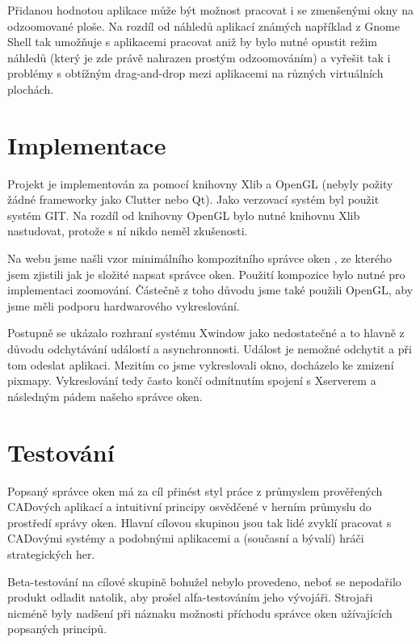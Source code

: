 \documentclass[12pt,a4paper,titlepage,final]{article}
\begin{document}
Přidanou hodnotou aplikace může být možnost pracovat i se zmenšenými okny na odzoomované ploše.
Na rozdíl od náhledů aplikací známých například z Gnome Shell tak umožňuje s aplikacemi pracovat aniž by bylo nutné opustit režim náhledů (který je zde právě nahrazen prostým odzoomováním) a vyřešit tak i problémy s obtížným drag-and-drop mezi aplikacemi na různých virtuálních plochách.

\section{Implementace}

Projekt je implementován za pomocí knihovny Xlib \cite{Xlib} a OpenGL (nebyly požity žádné frameworky jako Clutter nebo Qt).
Jako verzovací systém byl použit systém GIT.
Na rozdíl od knihovny OpenGL bylo nutné knihovnu Xlib nastudovat, protože s ní nikdo neměl zkušenosti.

Na webu jsme našli vzor minimálního kompozitního správce oken \cite{min_comp_wm}, ze kterého jsem zjistili jak je složité napsat správce oken.
Použití kompozice bylo nutné pro implementaci zoomování.
Částečně z toho důvodu jsme také použili OpenGL, aby jsme měli podporu hardwarového vykreslování.

Postupně se ukázalo rozhraní systému Xwindow jako nedostatečné a to hlavně z důvodu odchytávání událostí a asynchronnosti.
Událost je nemožné odchytit a při tom odeslat aplikaci.
Mezitím co jsme vykreslovali okno, docházelo ke zmizení pixmapy.
Vykreslování tedy často končí odmítnutím spojení s Xserverem a následným pádem našeho správce oken.

\section{Testování}

Popsaný správce oken má za cíl přinést styl práce z průmyslem prověřených CADových aplikací a intuitivní principy osvědčené v herním průmyslu do prostředí správy oken.
Hlavní cílovou skupinou jsou tak lidé zvyklí pracovat s CADovými systémy a podobnými aplikacemi a (současní a bývalí) hráči strategických her.

Beta-testování na cílové skupině bohužel nebylo provedeno, neboť se nepodařilo produkt odladit natolik,
aby prošel alfa-testováním jeho vývojáři. Strojaři nicméně byly nadšení při náznaku možnosti příchodu správce
oken užívajících popsaných principů.
\end{document}
